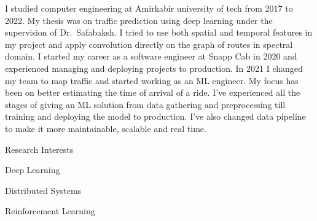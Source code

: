 

\begin{cvparagraph}
I studied computer engineering at Amirkabir university of tech from 2017 to 2022.
My thesis was on traffic prediction using deep learning under the supervision of Dr.\ Safabaksh.
I tried to use both spatial and temporal features in my project and apply
convolution directly on the graph of routes in spectral domain.
I started my career as a software engineer at Snapp Cab in 2020 and experienced managing
and deploying projects to production.
In 2021 I changed my team to map traffic and started working as an ML engineer.
My focus has been on better estimating the time of arrival of a ride.
I've experienced all the stages of giving an ML solution from data gathering and preprocessing
till training and deploying the model to production.
I've also changed data pipeline to make it more maintainable, scalable and real time.

\vspace{5mm}

  \cventry
    {}
    {Research Interests}
    {}
    {}
    {
      \begin{cvitems}
        \item {Deep Learning}
        \item {Distributed Systems}
        \item {Reinforcement Learning}
      \end{cvitems}
    }

\end{cvparagraph}
